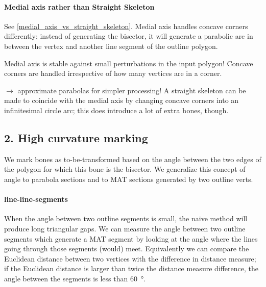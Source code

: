 \paragraph{Medial axis rather than Straight Skeleton}
See \cref{medial_axis_vs_straight_skeleton}.
Medial axis handles concave corners differently:
instead of generating the bisector, it will generate a parabolic arc in between the vertex and another line segment of the outline polygon.

Medial axis is stable against small perturbations in the input polygon!
Concave corners are handled irrespective of how many vertices are in a corner.


$\to$ approximate parabolas for simpler processing!
A straight skeleton can be made to coincide with the medial axis by changing concave corners into an infinitesimal circle arc;
this does introduce a lot of extra bones, though.






\subsection{2. High curvature marking}
\label{sec:transitioning_cutoff}
We mark bones as to-be-transformed based on the angle between the two edges of the polygon for which this bone is the bisector.
We generalize this concept of angle to parabola sections and to MAT sections generated by two outline verts.

\paragraph{line-line-segments}
When the angle between two outline segments is small, the naive method will produce long triangular gaps.
We can measure the angle between two outline segments which generate a MAT segment by looking at the angle where the lines going through those segments (would) meet.
Equivalently we can compare the Euclidean distance between two vertices with the difference in distance measure;
if the Euclidean distance is larger than twice the distance measure difference, the angle between the segments is less than {\SI{60}{\degree}}.

